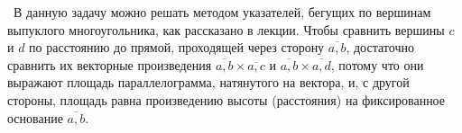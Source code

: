 \indent\indent\
В данную задачу можно решать методом указателей, бегущих
по вершинам выпуклого многоугольника, как рассказано в лекции.
Чтобы сравнить вершины $c$ и $d$ по расстоянию до прямой,
проходящей через сторону $\overline{a,b}$, достаточно
сравнить их векторные произведения $\overline{a,b}\times\overline{a,c}$
и $\overline{a,b}\times\overline{a,d}$, потому что они выражают
площадь параллелограмма, натянутого на вектора, и, с другой стороны,
площадь равна произведению высоты (расстояния) на фиксированное основание
$\overline{a,b}$.
